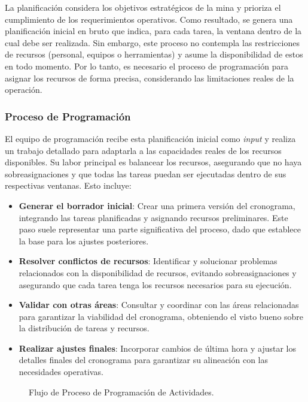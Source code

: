 \documentclass{article}
\begin{document}
La planificación considera los objetivos estratégicos de la mina y prioriza el cumplimiento de los requerimientos operativos. Como resultado, se genera una planificación inicial en bruto que indica, para cada tarea, la ventana dentro de la cual debe ser realizada. Sin embargo, este proceso no contempla las restricciones de recursos (personal, equipos o herramientas) y asume la disponibilidad de estos en todo momento. Por lo tanto, es necesario el proceso de programación para asignar los recursos de forma precisa, considerando las limitaciones reales de la operación.

\subsubsection{Proceso de Programación}

El equipo de programación recibe esta planificación inicial como \textit{input} y realiza un trabajo detallado para adaptarla a las capacidades reales de los recursos disponibles. Su labor principal es balancear los recursos, asegurando que no haya sobreasignaciones y que todas las tareas puedan ser ejecutadas dentro de sus respectivas ventanas. Esto incluye:

\begin{itemize}
    \item \textbf{Generar el borrador inicial}: Crear una primera versión del cronograma, integrando las tareas planificadas y asignando recursos preliminares. Este paso suele representar una parte significativa del proceso, dado que establece la base para los ajustes posteriores.
    \item \textbf{Resolver conflictos de recursos}: Identificar y solucionar problemas relacionados con la disponibilidad de recursos, evitando sobreasignaciones y asegurando que cada tarea tenga los recursos necesarios para su ejecución.
    \item \textbf{Validar con otras áreas}: Consultar y coordinar con las áreas relacionadas para garantizar la viabilidad del cronograma, obteniendo el visto bueno sobre la distribución de tareas y recursos.
    \item \textbf{Realizar ajustes finales}: Incorporar cambios de última hora y ajustar los detalles finales del cronograma para garantizar su alineación con las necesidades operativas.
\end{itemize}

\begin{figure}[htbp]
    \centering
    \caption{Flujo de Proceso de Programación de Actividades.}
    \label{fig:flowchart}
\end{figure}
\end{document}
